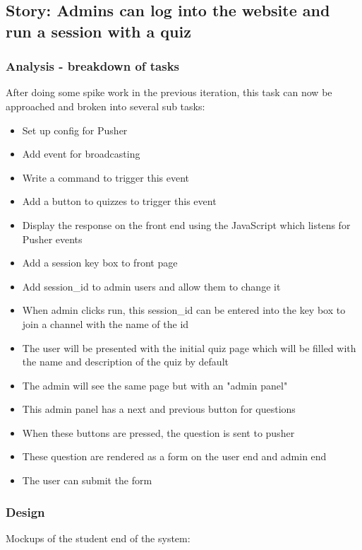 \subsection{Story: Admins can log into the website and run a session with a quiz}
\subsubsection{Analysis - breakdown of tasks}
After doing some spike work in the previous iteration, this task can now be approached and broken into several sub tasks:
\begin{itemize}
	\item Set up config for Pusher
	\item Add event for broadcasting
	\item Write a command to trigger this event
	\item Add a button to quizzes to trigger this event
	\item Display the response on the front end using the JavaScript which listens for Pusher events
	\item Add a session key box to front page
	\item Add session\_id to admin users and allow them to change it
	\item When admin clicks run, this session\_id can be entered into the key box to join a channel with the name of the id
	\item The user will be presented with the initial quiz page which will be filled with the name and description of the quiz by default
	\item The admin will see the same page but with an "admin panel"
	\item This admin panel has a next and previous button for questions
	\item When these buttons are pressed, the question is sent to pusher
	\item These question are rendered as a form on the user end and admin end
	\item The user can submit the form
\end{itemize}
\subsubsection{Design}
Mockups of the student end of the system: 


